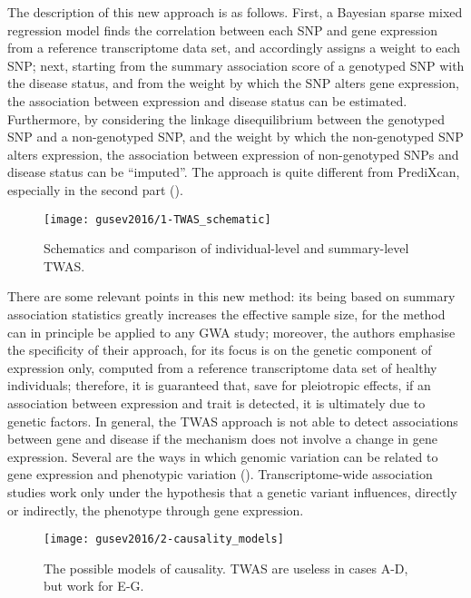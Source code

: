 \documentclass[../main.tex]{subfiles}
\begin{document}
The description of this new approach is as follows. First, a Bayesian 
sparse mixed regression model finds the correlation between each SNP and 
gene expression from a reference transcriptome data set, and accordingly 
assigns a weight to each SNP; next, starting from the summary 
association score of a genotyped SNP with the disease status, and from 
the weight by which the SNP alters gene expression, the association 
between expression and disease status can be estimated. Furthermore, by 
considering the linkage disequilibrium between the genotyped SNP and a 
non-genotyped SNP, and the weight by which the non-genotyped SNP alters 
expression, the association between expression of non-genotyped SNPs and 
disease status can be \enquote{imputed}. The approach is quite different 
from PrediXcan, especially in the second part ().

\begin{figure}
	\centering
	\texttt{[image: gusev2016/1-TWAS\_schematic]}
	\caption{Schematics and comparison of individual-level and 
summary-level TWAS.}
\end{figure}

There are some relevant points in this new method: its being based on 
summary association statistics greatly increases the effective sample 
size, for the method can in principle be applied to any GWA study; 
moreover, the authors emphasise the specificity of their approach, for 
its focus is on the genetic component of expression only, computed from 
a reference transcriptome data set of healthy individuals; therefore, it 
is guaranteed that, save for pleiotropic effects, if 
an association between expression and trait is detected, it is 
ultimately due to genetic factors. In general, the TWAS approach is not 
able to detect associations between gene and disease if the mechanism 
does not involve a change in gene expression. Several are the ways in 
which genomic variation can be related to gene expression and phenotypic 
variation (). Transcriptome-wide association studies 
work only under the hypothesis that a genetic variant influences, 
directly or indirectly, the phenotype through gene expression.

\begin{figure}
	\centering
	\texttt{[image: gusev2016/2-causality\_models]}
	\caption{The possible models of causality. TWAS are useless in cases 
A-D, but work for E-G.}
\end{figure}
\end{document}
